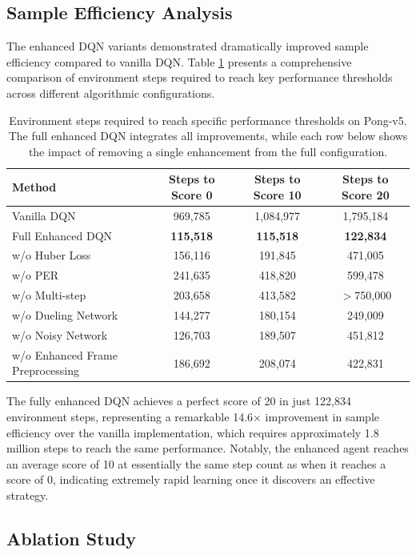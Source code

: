 \documentclass[a4paper]{article}
\begin{document}
\subsection{Sample Efficiency Analysis}

The enhanced DQN variants demonstrated dramatically improved sample efficiency compared to vanilla DQN. Table \ref{tab:sample_efficiency} presents a comprehensive comparison of environment steps required to reach key performance thresholds across different algorithmic configurations.

\begin{table}[h]
\centering
\caption{Environment steps required to reach specific performance thresholds on Pong-v5. The full enhanced DQN integrates all improvements, while each row below shows the impact of removing a single enhancement from the full configuration.}
\begin{tabular}{lccc}
\toprule
\textbf{Method} & \textbf{Steps to Score 0} & \textbf{Steps to Score 10} & \textbf{Steps to Score 20} \\
\midrule
Vanilla DQN & 969,785 & 1,084,977 & 1,795,184 \\
\midrule
Full Enhanced DQN & \textbf{115,518} & \textbf{115,518} & \textbf{122,834} \\
\midrule
w/o Huber Loss & 156,116 & 191,845 & 471,005 \\
w/o PER & 241,635 & 418,820 & 599,478 \\
w/o Multi-step & 203,658 & 413,582 & $>$750,000 \\
w/o Dueling Network & 144,277 & 180,154 & 249,009 \\
w/o Noisy Network & 126,703 & 189,507 & 451,812 \\
w/o Enhanced Frame Preprocessing & 186,692 & 208,074 & 422,831 \\
\bottomrule
\end{tabular}
\label{tab:sample_efficiency}
\end{table}

The fully enhanced DQN achieves a perfect score of 20 in just 122,834 environment steps, representing a remarkable 14.6× improvement in sample efficiency over the vanilla implementation, which requires approximately 1.8 million steps to reach the same performance. Notably, the enhanced agent reaches an average score of 10 at essentially the same step count as when it reaches a score of 0, indicating extremely rapid learning once it discovers an effective strategy.

\subsection{Ablation Study}
\end{document}
